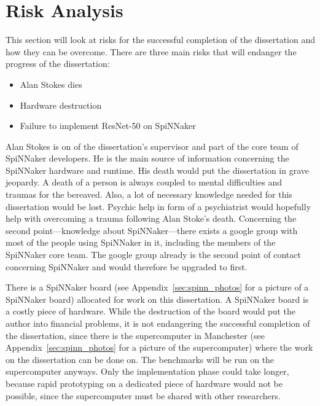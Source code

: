 \documentclass{article}
\begin{document}

\section{Risk Analysis} %
\label{sec:risk_analysis}

This section will look at risks for the successful
completion of the dissertation and how they can be
overcome.
There are three main risks that will endanger the progress
of the dissertation:
\begin{itemize}
  \item Alan Stokes dies
  \item Hardware destruction
  \item Failure to implement ResNet-50 on SpiNNaker
\end{itemize}

Alan Stokes is on of the dissertation's supervisor and part
of the core team of SpiNNaker developers.
He is the main source of information concerning the
SpiNNaker hardware and runtime.
His death would put the dissertation in grave jeopardy.
A death of a person is always coupled to mental
difficulties and traumas for the bereaved.
Also, a lot of necessary knowledge needed for this
dissertation would be lost.
Psychic help in form of a psychiatrist would hopefully help
with overcoming a trauma following Alan Stoke's death.
Concerning the second point---knowledge about
SpiNNaker---there exists a google group with most of the
people using SpiNNaker in it, including the members of the
SpiNNaker core team.
The google group already is the second point of contact
concerning SpiNNaker and would therefore be upgraded to
first.

There is a SpiNNaker board (see
Appendix~\ref{sec:spinn_photos} for a picture of a
SpiNNaker board) allocated for work on this dissertation.
A SpiNNaker board is a costly piece of hardware.
While the destruction of the board would put the author
into financial problems, it is not endangering the
successful completion of the dissertation, since there is
the supercomputer in Manchester (see
Appendix~\ref{sec:spinn_photos} for a picture of the
supercomputer) where the work on the dissertation can be
done on.
The benchmarks will be run on the supercomputer anyways.
Only the implementation phase could take longer, because
rapid prototyping on a dedicated piece of hardware would
not be possible, since the supercomputer must be shared
with other researchers.
\end{document}
